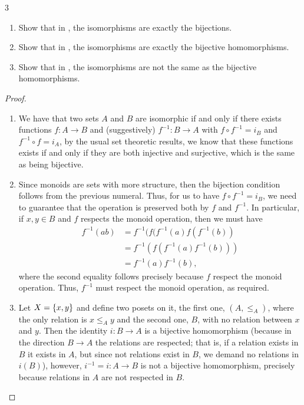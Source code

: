 \begin{exercise}{3}
\begin{enumerate}
    \item Show that in \Set, the isomorphisms are exactly the bijections.
    \item Show that in \Monoid, the isomorphisms are exactly the bijective homomorphisms.
    \item Show that in \Poset, the isomorphisms are not the same as the bijective homomorphisms.
\end{enumerate}
\end{exercise}
\begin{proof}
\begin{enumerate}
    \item We have that two sets $A$ and $B$ are isomorphic if and only if there exists functions $f: A \to B$ and (suggestively) $f^{-1}: B \to A$ with $f \circ f^{-1} = i_B$ and $f^{-1} \circ f = i_A$, by the usual set theoretic results, we know that these functions exists if and only if they are both injective and surjective, which is the same as being bijective.
    \item Since monoids are sets with more structure, then the bijection condition follows from the previous numeral.
    Thus, for us to have $f \circ f^{-1} = i_B$, we need to guarantee that the operation is preserved both by $f$ and $f^{-1}$.
    In particular, if $x, y \in B$ and $f$ respects the monoid operation, then we must have 
    \begin{align*}
        f^{-1}(ab)
        &= f^{-1}(f(f^{-1}(a) f(f^{-1}(b))\\
        &= f^{-1}(f(f^{-1}(a) f^{-1}(b)))\\
        &= f^{-1}(a) f^{-1}(b),
    \end{align*}
    where the second equality follows precisely because $f$ respect the monoid operation.
    Thus, $f^{-1}$ must respect the monoid operation, as required.
    \item Let $X = \{x,y\}$ and define two posets on it, the first one, $(A, \leq_A)$, where the only relation is  $x \leq_A y$ and the second one, $B$, with no relation between $x$ and $y$. 
    Then the identity $i: B \to A$ is a bijective homomorphism (because in the direction $B \to A$ the relations are respected; 
    that is, if a relation exists in $B$ it exists in $A$, but since not relations exist in $B$, we demand no relations in $i(B)$), however, $i^{-1} = i : A \to B$ is not a bijective homomorphism, precisely because relations in $A$ are not respected in $B$.
\end{enumerate}
\end{proof} 

